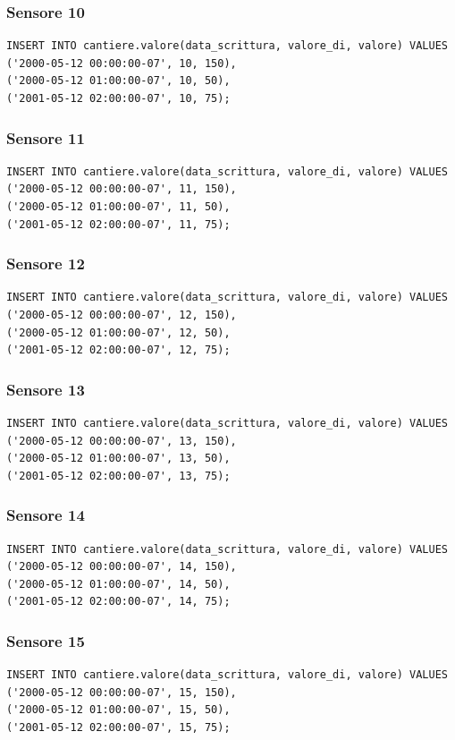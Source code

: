\documentclass[11pt]{article}
\begin{document}
\subsubsection*{Sensore 10}
\label{sec:orgabb3682}
\begin{verbatim}
INSERT INTO cantiere.valore(data_scrittura, valore_di, valore) VALUES
('2000-05-12 00:00:00-07', 10, 150),
('2000-05-12 01:00:00-07', 10, 50),
('2001-05-12 02:00:00-07', 10, 75);
\end{verbatim}
\subsubsection*{Sensore 11}
\label{sec:org7dd0c97}
\begin{verbatim}
INSERT INTO cantiere.valore(data_scrittura, valore_di, valore) VALUES
('2000-05-12 00:00:00-07', 11, 150),
('2000-05-12 01:00:00-07', 11, 50),
('2001-05-12 02:00:00-07', 11, 75);
\end{verbatim}
\subsubsection*{Sensore 12}
\label{sec:orgbef0b4d}
\begin{verbatim}
INSERT INTO cantiere.valore(data_scrittura, valore_di, valore) VALUES
('2000-05-12 00:00:00-07', 12, 150),
('2000-05-12 01:00:00-07', 12, 50),
('2001-05-12 02:00:00-07', 12, 75);
\end{verbatim}
\subsubsection*{Sensore 13}
\label{sec:org7de6ab3}
\begin{verbatim}
INSERT INTO cantiere.valore(data_scrittura, valore_di, valore) VALUES
('2000-05-12 00:00:00-07', 13, 150),
('2000-05-12 01:00:00-07', 13, 50),
('2001-05-12 02:00:00-07', 13, 75);
\end{verbatim}
\subsubsection*{Sensore 14}
\label{sec:org53e5744}
\begin{verbatim}
INSERT INTO cantiere.valore(data_scrittura, valore_di, valore) VALUES
('2000-05-12 00:00:00-07', 14, 150),
('2000-05-12 01:00:00-07', 14, 50),
('2001-05-12 02:00:00-07', 14, 75);
\end{verbatim}
\subsubsection*{Sensore 15}
\label{sec:orgedd513e}
\begin{verbatim}
INSERT INTO cantiere.valore(data_scrittura, valore_di, valore) VALUES
('2000-05-12 00:00:00-07', 15, 150),
('2000-05-12 01:00:00-07', 15, 50),
('2001-05-12 02:00:00-07', 15, 75);
\end{verbatim}
\end{document}
